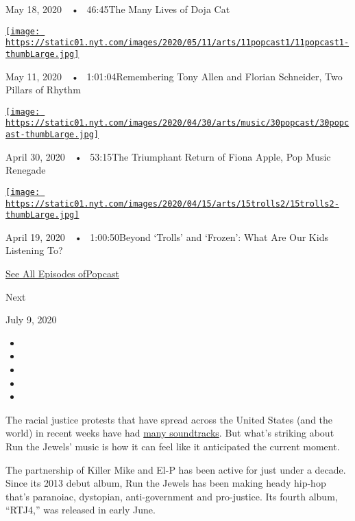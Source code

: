 May 18, 2020~~•~ 46:45The Many Lives of Doja Cat

\href{https://www.nytimes.com/2020/05/11/arts/music/popcast-tony-allen-florian-schneider.html?action=click\&module=audio-series-bar\&region=header\&pgtype=Article}{\texttt{[image: https://static01.nyt.com/images/2020/05/11/arts/11popcast1/11popcast1-thumbLarge.jpg]}}

May 11, 2020~~•~ 1:01:04Remembering Tony Allen and Florian Schneider,
Two Pillars of Rhythm

\href{https://www.nytimes.com/2020/04/30/arts/music/popcast-fiona-apple.html?action=click\&module=audio-series-bar\&region=header\&pgtype=Article}{\texttt{[image: https://static01.nyt.com/images/2020/04/30/arts/music/30popcast/30popcast-thumbLarge.jpg]}}

April 30, 2020~~•~ 53:15The Triumphant Return of Fiona Apple, Pop Music
Renegade

\href{https://www.nytimes.com/2020/04/19/arts/music/popcast-kids-music.html?action=click\&module=audio-series-bar\&region=header\&pgtype=Article}{\texttt{[image: https://static01.nyt.com/images/2020/04/15/arts/15trolls2/15trolls2-thumbLarge.jpg]}}

April 19, 2020~~•~ 1:00:50Beyond `Trolls' and `Frozen': What Are Our
Kids Listening To?

\href{https://www.nytimes.com/column/popcast-pop-music-podcast}{See All
Episodes ofPopcast}

Next

July 9, 2020

\begin{itemize}
\item
\item
\item
\item
\item
\end{itemize}

The racial justice protests that have spread across the United States
(and the world) in recent weeks have had
\href{https://www.nytimes.com/2020/06/30/arts/music/fivio-foreign-big-drip-brooklyn-drill.html}{many
soundtracks}. But what's striking about Run the Jewels' music is how it
can feel like it anticipated the current moment.

The partnership of Killer Mike and El-P has been active for just under a
decade. Since its 2013 debut album, Run the Jewels has been making heady
hip-hop that's paranoiac, dystopian, anti-government and pro-justice.
Its fourth album, ``RTJ4,'' was released in early June.

